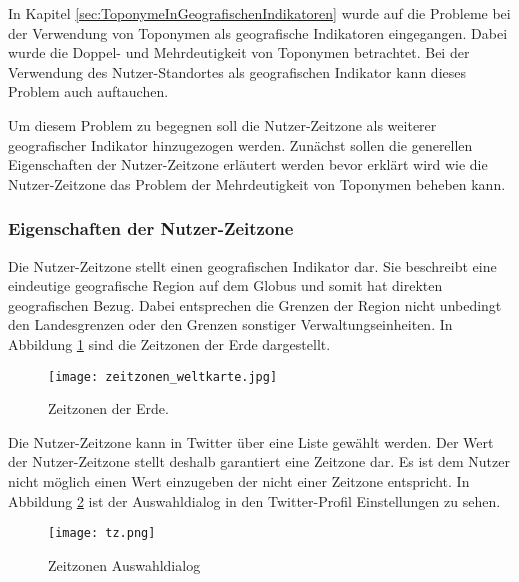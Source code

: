 			In Kapitel \ref{sec:ToponymeInGeografischenIndikatoren} wurde auf die Probleme bei der Verwendung von Toponymen als geografische Indikatoren eingegangen.
			Dabei wurde die Doppel- und Mehrdeutigkeit von Toponymen betrachtet.
			Bei der Verwendung des Nutzer-Standortes als geografischen Indikator kann dieses Problem auch auftauchen. 

			Um diesem Problem zu begegnen soll die Nutzer-Zeitzone als weiterer geografischer Indikator hinzugezogen werden.
			Zunächst sollen die generellen Eigenschaften der Nutzer-Zeitzone erläutert werden bevor erklärt wird wie die Nutzer-Zeitzone das Problem der Mehrdeutigkeit von Toponymen beheben kann.

			\subsubsection{Eigenschaften der Nutzer-Zeitzone}

				Die Nutzer-Zeitzone stellt einen geografischen Indikator dar.
				Sie beschreibt eine eindeutige geografische Region auf dem Globus und somit hat direkten geografischen Bezug.
				Dabei entsprechen die Grenzen der Region nicht unbedingt den Landesgrenzen oder den Grenzen sonstiger Verwaltungseinheiten. 
				In Abbildung \ref{img:timezones} sind die Zeitzonen der Erde dargestellt.

				\begin{figure}[!ht]
					\begin{center}
						\texttt{[image: zeitzonen\_weltkarte.jpg]}
						\caption{Zeitzonen der Erde.}
						\label{img:timezones}
					\end{center}
				\end{figure}	

				Die Nutzer-Zeitzone kann in Twitter über eine Liste gewählt werden.
				Der Wert der Nutzer-Zeitzone stellt deshalb garantiert eine Zeitzone dar.
				Es ist dem Nutzer nicht möglich einen Wert einzugeben der nicht einer Zeitzone entspricht.
				In Abbildung \ref{img:twitterTZ} ist der Auswahldialog in den Twitter-Profil Einstellungen zu sehen.


				\begin{figure}[!ht]
					\begin{center}
						\texttt{[image: tz.png]}
						\caption{Zeitzonen Auswahldialog}
						\label{img:twitterTZ}
					\end{center}
				\end{figure}	

